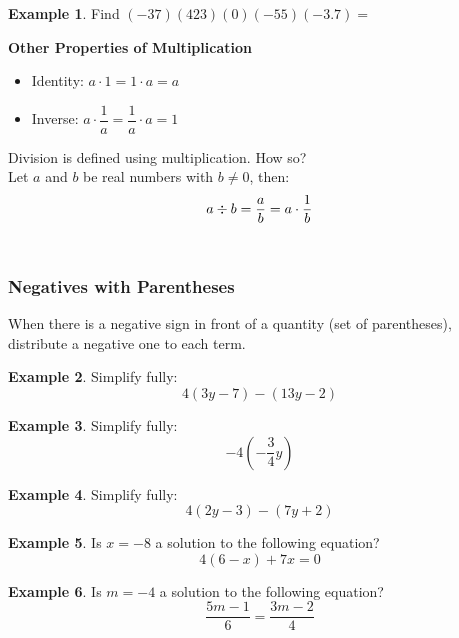 \documentclass[addpoints,12pt]{exam}
\theoremstyle{definition}
\newtheorem{example}{Example}[subsection]
\begin{document}
\begin{example}
Find $(-37)(423)(0)(-55)(-3.7) = $
\vspace{.5in}
\end{example}

\begin{mdframed}
\textbf{Other Properties of Multiplication}
\begin{itemize}
\item Identity: $a\cdot 1 = 1\cdot a = a$
\item Inverse: $a \cdot \dfrac{1}{a} = \dfrac{1}{a}\cdot a = 1$
\end{itemize}
\end{mdframed}
\vspace{.15in}
\noindent Division is defined using multiplication. How so?\\

\noindent Let $a$ and $b$ be real numbers with $b \neq 0$, then: \[a\divisionsymbol b = \dfrac{a}{b} = a \cdot \dfrac{1}{b}\]
\\
\subsubsection*{Negatives with Parentheses}

\noindent When there is a negative sign in front of a quantity (set of parentheses), distribute a negative one to each term.

\begin{example}
Simplify fully: \[4(3y-7) - (13y-2)\]
\end{example}

\newpage

\begin{example}
Simplify fully: \[-4(-\dfrac{3}{4}y)\]
\vspace{1in}
\end{example}

\begin{example}
Simplify fully: \[4(2y-3)-(7y+2)\]
\vspace{1in}
\end{example}

\begin{example}
Is $x = -8$ a solution to the following equation? \[4(6-x) + 7x = 0\]
\vspace{1in}
\end{example}

\begin{example}
Is $m = -4$ a solution to the following equation? \[\dfrac{5m-1}{6} = \dfrac{3m-2}{4}\]
\end{example}
\end{document}
